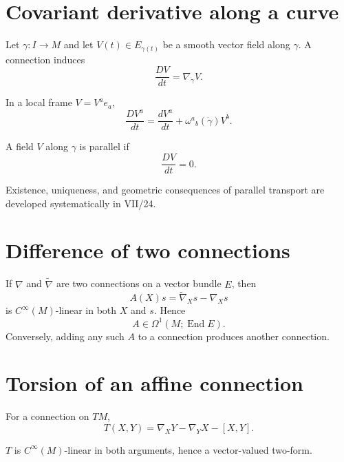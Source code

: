 \section{Covariant derivative along a curve}

\begin{definition}\label{def:vii21-along-curve}
Let \(\gamma:I\to M\) and let \(V(t)\in E_{\gamma(t)}\) be a smooth vector field
along \(\gamma\).  A connection induces
\[
\frac{DV}{dt}=\nabla_{\dot\gamma}V.
\]
\end{definition}

In a local frame \(V=V^ae_a\),
\[
\frac{DV^a}{dt}
=
\frac{dV^a}{dt}
+
\omega^a{}_b(\dot\gamma)V^b.
\]

\begin{definition}\label{def:vii21-parallel-field}
A field \(V\) along \(\gamma\) is parallel if
\[
\frac{DV}{dt}=0.
\]
\end{definition}

\begin{remark}
Existence, uniqueness, and geometric consequences of parallel transport are
developed systematically in VII/24.
\end{remark}

\section{Difference of two connections}

\begin{theorem}\label{thm:vii21-affine-space}
If \(\nabla\) and \(\widetilde\nabla\) are two connections on a vector bundle \(E\),
then
\[
A(X)s
=
\widetilde\nabla_Xs-\nabla_Xs
\]
is \(C^\infty(M)\)-linear in both \(X\) and \(s\). Hence
\[
A\in\Omega^1(M;\operatorname{End}E).
\]
Conversely, adding any such \(A\) to a connection produces another connection.
\end{theorem}

\section{Torsion of an affine connection}

\begin{definition}[Torsion]\label{def:vii21-torsion}
For a connection on \(TM\),
\[
T(X,Y)
=
\nabla_XY-\nabla_YX-[X,Y].
\]
\end{definition}

\begin{proposition}\label{prop:vii21-torsion-tensor}
\(T\) is \(C^\infty(M)\)-linear in both arguments, hence a vector-valued
two-form.
\end{proposition}

